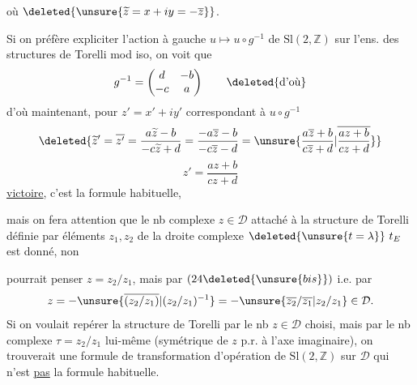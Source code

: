 où $\deleted{\unsure{\widetilde z=x+iy=-\overline z}}$.

Si on  préfère expliciter l'action à gauche $u\longmapsto u\circ g^{-1}$ de $\mathrm{Sl}(2,\mathbb Z)$ sur l'ens. des structures de Torelli mod iso, on voit que
\[
g^{-1}=\begin{pmatrix}d&-b\\-c&a\end{pmatrix}
\qquad\deleted{\text{d'où}}
\]
d'où maintenant, pour $z'=x'+iy'$ correspondant à $u\circ g^{-1}$
\[
\deleted{\widetilde z'=\overline{z'}
=\frac{a\widetilde z-b}{-c\widetilde z+d}
=\frac{-a\overline z-b}{-c\overline z-d}
=\unsure{\frac{a\overline z+b}{c\overline z+d}|\overline{\frac{az+b}{cz+d}}}}
\]
\begin{equation}
z'=\frac{az+b}{cz+d}
\tag{25 bis}
\end{equation}
\uline{victoire}, c'est la formule habituelle,

mais on fera attention que le nb complexe $z\in\mathcal D$ attaché à la structure de Torelli définie par  éléments $z_1,z_2$ de la droite complexe $\deleted{\unsure{t=\lambda}}\ t_E$ est donné, non

 pourrait penser $z=z_2/z_1$,  mais par $(24\deleted{\unsure{bis}})$ i.e. par
\[
z=-\unsure{\overline{(z_2/z_1)}|(z_2/z_1)^{-1}}
=-\unsure{\overline{z_2}/\overline{z_1}|z_2/z_1}\in\mathcal D.
\]
Si on voulait repérer  la structure de Torelli par le nb $z\in\mathcal D$ choisi, mais par le nb complexe $\tau=z_2/z_1$ lui-même (symétrique de $z$ p.r. à l'axe imaginaire), on trouverait une formule de transformation d'opération de $\mathrm{Sl}(2,\mathbb Z)$ sur $\mathcal D$ qui n'est \uline{pas} la formule habituelle.


